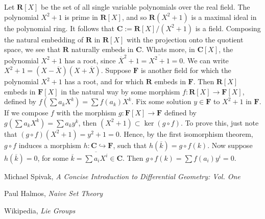 \begin{example}
    Let $\mathbf{R}[X]$ be the set of all single variable polynomials over the real field. The polynomial $X^2 + 1$ is prime in $\mathbf{R}[X]$, and so $\mathbf{R}(X^2 + 1)$ is a maximal ideal in the polynomial ring. It follows that $\mathbf{C} := \mathbf{R}[X]/(X^2 + 1)$ is a field. Composing the natural embedding of $\mathbf{R}$ in $\mathbf{R}[X]$ with the projection onto the quotient space, we see that $\mathbf{R}$ naturally embeds in $\mathbf{C}$. Whats more, in $\mathbf{C}[X]$, the polynomial $X^2 + 1$ has a root, since $\overline{X}^2 + 1 = \overline{X^2 + 1} = 0$. We can write $X^2 + 1 = (X - \overline{X})(X + \overline{X})$. Suppose $\mathbf{F}$ is another field for which the polynomial $X^2 + 1$ has a root, and for which $\mathbf{R}$ embeds in $\mathbf{F}$. Then $\mathbf{R}[X]$ embeds in $\mathbf{F}[X]$ in the natural way by some morphism $f:\mathbf{R}[X] \to \mathbf{F}[X]$, defined by $f(\sum a_kX^k) = \sum f(a_k)X^k$. Fix some solution $y \in \mathbf{F}$ to $X^2 + 1$ in $\mathbf{F}$. If we compose $f$ with the morphism $g:\mathbf{F}[X] \to \mathbf{F}$ defined by $g(\sum a_k X^k) = \sum a_k y^k$, then $(X^2 + 1) \subset \ker(g \circ f)$. To prove this, just note that $(g \circ f)(X^2 + 1) = y^2 + 1 = 0$. Hence, by the first isomorphism theorem, $g \circ f$ induces a morphism $h:\mathbf{C} \hookrightarrow \mathbf{F}$, such that $h(\overline{k}) = g \circ f (k)$. Now suppose $h(\overline{k}) = 0$, for some $\overline{k} = \overline{\sum a_iX^i} \in \mathbf{C}$. Then $g \circ f (k) = \sum f(a_i)y^i = 0$.
\end{example}

\begin{thebibliography}{10}
     Michael Spivak,
    \emph{A Concise Introduction to Differential Geometry: Vol. One}

     Paul Halmos,
    \emph{Naive Set Theory}

     Wikipedia,
    \emph{Lie Groups}
\end{thebibliography}

